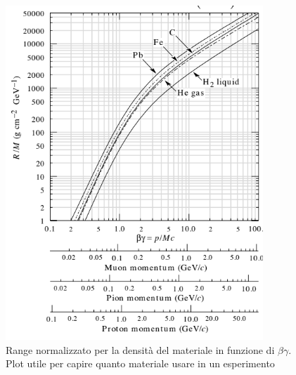 \hspace{-20pt}
\begin{minipage}{0.48\textwidth}
    \begin{figure}[H]
        \centering
        \includegraphics[width=\textwidth,frame]{Chapters/images/Interazione_radiazione_materia/image-20220216172742194.png}
        \captionsetup{width=\textwidth}
        \centering
        \caption{Range normalizzato per la densità del materiale in funzione di $\beta \gamma$.\\
        Plot utile per capire quanto materiale usare in un esperimento}
        \label{fig:}
    \end{figure}
\end{minipage} \hspace{0.5cm}

